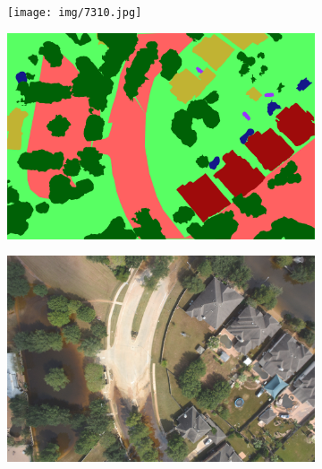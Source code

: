 \begin{figure}[h!]
     \centering
     \begin{subfigure}[b]{0.45\textwidth}
         \centering
         \texttt{[image: img/7310.jpg]}
         \caption{}
         \label{}
     \end{subfigure}
     \hfill
     \begin{subfigure}[b]{0.45\textwidth}
         \centering
         \includegraphics[width=\textwidth]{img/7310_lab.png}
         \caption{}
         \label{}
     \end{subfigure}
     \hfill
     \begin{subfigure}[b]{0.45\textwidth}
         \centering
         \includegraphics[width=\textwidth]{img/7310_0.jpg}
         \caption{}
         \label{}
     \end{subfigure}
     \hfill
     \begin{subfigure}[b]{0.45\textwidth}

\end{subfigure}
\end{figure}
